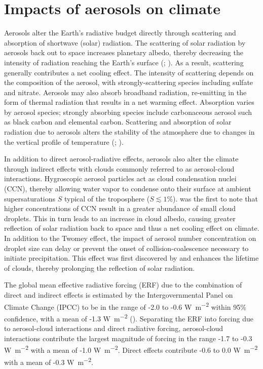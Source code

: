 \cite{seinfeld_atmospheric_1998}

\section{Impacts of aerosols on climate}

Aerosols alter the Earth's radiative budget directly through scattering and absorption of shortwave (solar) radiation. The scattering of solar radiation by aerosols back out to space increases planetary albedo, thereby decreasing the intensity of radiation reaching the Earth's surface (\cite{charlson_climate_1969}; \cite{charlson_climate_1992}). As a result, scattering generally contributes a net cooling effect. The intensity of scattering depends on the composition of the aerosol, with strongly-scattering species including sulfate and nitrate. Aerosols may also absorb broadband radiation, re-emitting in the form of thermal radiation that results in a net warming effect. Absorption varies by aerosol species; strongly absorbing species include carbonaceous aerosol such as black carbon and elemental carbon. Scattering and absorption of solar radiation due to aerosols alters the stability of the atmosphere due to changes in the vertical profile of temperature (\cite{li_scattering_2022}; \cite{lau_observational_2006}). 

In addition to direct aerosol-radiative effects, aerosols also alter the climate through indirect effects with clouds commonly referred to as aerosol-cloud interactions. Hygroscopic aerosol particles act as cloud condensation nuclei (CCN), thereby allowing water vapor to condense onto their surface at ambient supersaturations $S$ typical of the troposphere ($S\lesssim1\%$). \cite{twomey_influence_1977} was the first to note that higher concentrations of CCN result in a greater abundance of small cloud droplets. This in turn leads to an increase in cloud albedo, causing greater reflection of solar radiation back to space and thus a net cooling effect on climate. In addition to the Twomey effect, the impact of aerosol number concentration on droplet size can delay or prevent the onset of collision-coalescence necessary to initiate precipitation. This effect was first discovered by \cite{albrecht_aerosols_1989} and enhances the lifetime of clouds, thereby prolonging the reflection of solar radiation. 

The global mean effective radiative forcing (ERF) due to the combination of direct and indirect effects is estimated by the Intergovernmental Panel on Climate Change (IPCC) to be in the range of -2.0 to -0.6 \si{W.m^{-2}} within 95\% confidence, with a mean of -1.3 \si{W.m^{-2}} (\cite{ipcc_report_2021}). Separating the ERF into forcing due to aerosol-cloud interactions and direct radiative forcing, aerosol-cloud interactions contribute the largest magnitude of forcing in the range -1.7 to -0.3 \si{W.m^{-2}} with a mean of -1.0 \si{W.m^{-2}}. Direct effects contribute -0.6 to 0.0 \si{W.m^{-2}} with a mean of -0.3 \si{W.m^{-2}}. 

